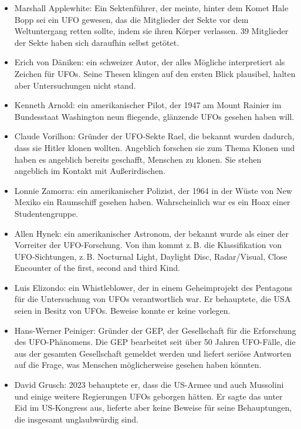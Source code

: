 \documentclass{scrartcl}
\begin{document}
\begin{itemize}
	\item Marshall Applewhite: Ein Sektenführer, der meinte, hinter dem Komet Hale Bopp sei ein UFO gewesen, das die Mitglieder der Sekte vor dem Weltuntergang retten sollte, indem sie \frq ihren Körper verlassen\flq. 39 Mitglieder der Sekte haben sich daraufhin selbst getötet.
	\item Erich von Däniken: ein schweizer Autor, der alles Mögliche interpretiert als Zeichen für UFOs. Seine Thesen klingen auf den ersten Blick plausibel, halten aber Untersuchungen nicht stand.
	\item Kenneth Arnold: ein amerikanischer Pilot, der 1947 am Mount Rainier im Bundesstaat Washington neun fliegende, glänzende UFOs gesehen haben will.
	\item Claude Vorilhon: Gründer der UFO-Sekte \frqq Rael\flqq, die bekannt wurden dadurch, dass sie Hitler klonen wollten. Angeblich forschen sie zum Thema Klonen und haben es angeblich bereits geschafft, Menschen zu klonen. Sie stehen angeblich im Kontakt mit Außerirdischen.
	\item Lonnie Zamorra: ein amerikanischer Polizist, der 1964 in der Wüste von New Mexiko ein Raumschiff gesehen haben. Wahrscheinlich war es ein Hoax einer Studentengruppe.
	\item Allen Hynek: ein amerikanischer Astronom, der bekannt wurde als einer der Vorreiter der UFO-Forschung. Von ihm kommt z.\,B. die Klassifikation von UFO-Sichtungen, z.\,B. Nocturnal Light, Daylight Disc, Radar/Visual, Close Encounter of the first, second and third Kind.
	\item Luis Elizondo: ein Whistleblower, der in einem Geheimprojekt des Pentagons für die Untersuchung von UFOs verantwortlich war. Er behauptete, die USA seien in Besitz von UFOs. Beweise konnte er keine vorlegen.
	\item Hans-Werner Peiniger: Gründer der GEP, der Gesellschaft für die Erforschung des UFO-Phänomens. Die GEP bearbeitet seit über 50 Jahren UFO-Fälle, die aus der gesamten Gesellschaft gemeldet werden und liefert seriöse Antworten auf die Frage, was Menschen möglicherweise gesehen haben könnten.
	\item David Grusch: 2023 behauptete er, dass die US-Armee und auch Mussolini und einige weitere Regierungen UFOs geborgen hätten. Er sagte das unter Eid im US-Kongress aus, lieferte aber keine Beweise für seine Behauptungen, die insgesamt unglaubwürdig sind.
\end{itemize}
\end{document}
